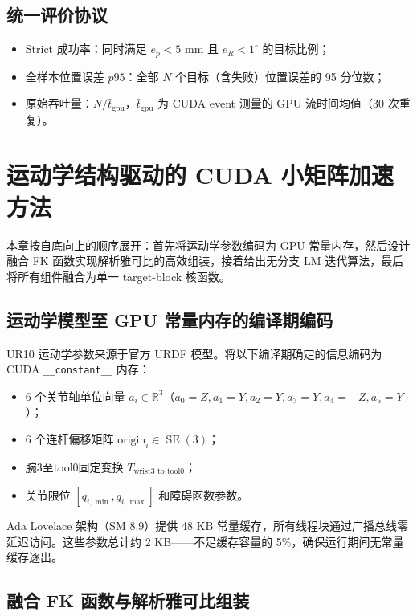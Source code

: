 \documentclass[twocolumn,a4paper,10pt]{ctexart}
\DeclareMathOperator{\SE}{SE}
\newcommand{\R}{\mathbb{R}}
\begin{document}
\subsection{统一评价协议}

\begin{itemize}
  \item Strict 成功率：同时满足 $e_p<5$ mm 且 $e_R<1^\circ$ 的目标比例；
  \item 全样本位置误差 $p95$：全部 $N$ 个目标（含失败）位置误差的 95 分位数；
  \item 原始吞吐量：$N/\bar{t}_{\mathrm{gpu}}$，$\bar{t}_{\mathrm{gpu}}$ 为 CUDA event 测量的 GPU 流时间均值（30 次重复）。
\end{itemize}

\section{运动学结构驱动的 CUDA 小矩阵加速方法}

本章按自底向上的顺序展开：首先将运动学参数编码为 GPU 常量内存，然后设计融合 FK 函数实现解析雅可比的高效组装，接着给出无分支 LM 迭代算法，最后将所有组件融合为单一 target-block 核函数。

\subsection{运动学模型至 GPU 常量内存的编译期编码}

UR10 运动学参数来源于官方 URDF 模型\cite{urdf}。将以下编译期确定的信息编码为 CUDA \texttt{\_\_constant\_\_} 内存：

\begin{itemize}
  \item 6 个关节轴单位向量 $a_i\in\R^3$（$a_0=Z,a_1=Y,a_2=Y,a_3=Y,a_4=-Z,a_5=Y$）；
  \item 6 个连杆偏移矩阵 $\mathrm{origin}_i\in\SE(3)$；
  \item 腕3至tool0固定变换 $T_{\mathrm{wrist3\_to\_tool0}}$；
  \item 关节限位 $[q_{i,\min},q_{i,\max}]$ 和障碍函数参数。
\end{itemize}

Ada Lovelace 架构（SM 8.9）提供 48 KB 常量缓存，所有线程块通过广播总线零延迟访问。这些参数总计约 2 KB——不足缓存容量的 5\%，确保运行期间无常量缓存逐出。

\subsection{融合 FK 函数与解析雅可比组装}
\end{document}
